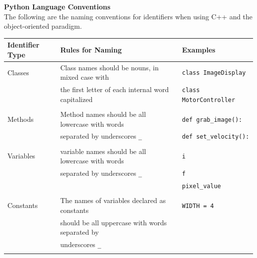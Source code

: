 \documentclass{CSSRforAfrica}
\newcommand{\blank}{~\\}
\begin{document}
\begin{appendices}
\newpage
\noindent
{\bf Python Language Conventions}\\
The following are the naming conventions for identifiers when using C++ and the 
object-oriented paradigm.
\blank
{\small
\begin{tabular}{l|l l}
Identifier Type & Rules for Naming                                   &Examples                                 \\ \hline
Classes         & Class names should be nouns, in mixed case with    &\verb+class ImageDisplay+                \\ 
                & the first letter of each internal word capitalized &\verb+class MotorController+             \\ 
                &                                                    &                                         \\ 
Methods       & Method names should be all lowercase with words  &\verb+def grab_image():+      \\ 
                & separated by underscores {\small \verb+_+}         &\verb+def set_velocity():+   \\ 
                &                                                    &                                         \\ 
Variables       & variable names should be all lowercase with words  &{\small \verb+i+}                \\ 
                & separated by underscores {\small \verb+_+}         &{\small \verb+f+}                \\ 
                &                  &{\small \verb+pixel_value+}      \\ 
                &                                                    &                                         \\ 
Constants       & The names of variables declared as constants       &{\small \verb+WIDTH = 4+}     \\ 
                & should be all uppercase with words separated by    &                                         \\ 
                & underscores {\small \verb+_+}                      &                                         \\ 
                &                                                    &                                         \\ 
\end{tabular}
}


\end{appendices}
\end{document}
